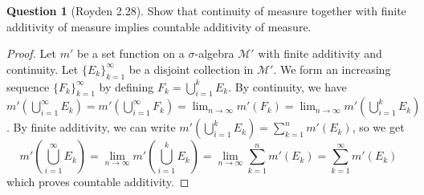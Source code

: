\documentclass{article}
\theoremstyle{definition} %
\numberwithin{thm}{section} %
\theoremstyle{definition} %
\newtheorem{question}[thm]{Question}
\begin{document}
\begin{question}[Royden 2.28]
Show that continuity of measure together with finite additivity of measure implies countable additivity of measure.
\end{question}
\begin{proof}
Let $m'$ be a set function on a $\sigma$-algebra $\mathcal{M}'$ with finite additivity and continuity. Let ${\{E_k\}}_{k = 1}^\infty$ be a disjoint collection in $\mathcal{M}'$. We form an increasing sequence ${\{F_k\}}_{k = 1}^\infty$ by defining $F_k = \bigcup_{i = 1}^k E_k$. By continuity, we have $m'(\bigcup_{i = 1}^\infty E_k) = m'(\bigcup_{i = 1}^\infty F_k) = \lim_{n \to \infty} m'(F_k) = \lim_{n \to \infty} m'(\bigcup_{i = 1}^k E_k)$. By finite additivity, we can write $m'(\bigcup_{i = 1}^k E_k) = \sum_{k = 1}^n m'(E_k)$, so we get 
\[ m'(\bigcup_{i = 1}^\infty E_k) = \lim_{n \to \infty} m'(\bigcup_{i = 1}^k E_k) = \lim_{n \to \infty} \sum_{k = 1}^n m'(E_k) = \sum_{k = 1}^\infty m'(E_k) \]
which proves countable additivity.
\end{proof}
\end{document}
